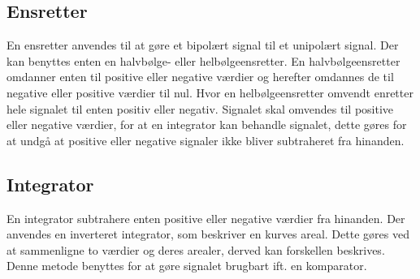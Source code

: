 \subsection{Ensretter}
En ensretter anvendes til at gøre et bipolært signal til et unipolært signal. Der kan benyttes enten en halvbølge- eller helbølgeensretter. En halvbølgeensretter omdanner enten til positive eller negative værdier og herefter omdannes de til negative eller positive værdier til nul. Hvor en helbølgeensretter omvendt enretter hele signalet til enten positiv eller negativ. 
Signalet skal omvendes til positive eller negative værdier, for at en integrator kan behandle signalet, dette gøres for at undgå at positive eller negative signaler ikke bliver subtraheret fra hinanden.

\subsection{Integrator}
En integrator subtrahere enten positive eller negative værdier fra hinanden. Der anvendes en inverteret integrator, som beskriver en kurves areal. Dette gøres ved at sammenligne to værdier og deres arealer, derved kan forskellen beskrives. 
Denne metode benyttes for at gøre signalet brugbart ift. en komparator.
